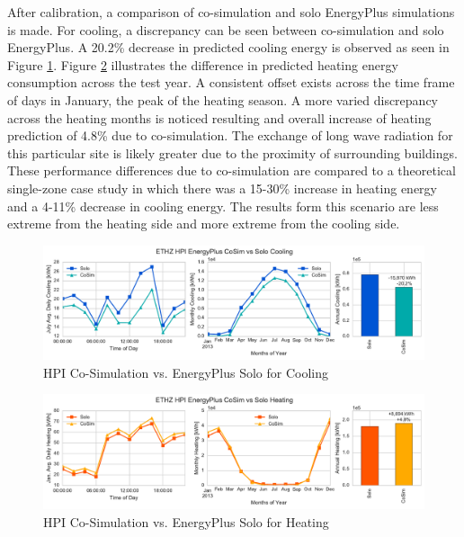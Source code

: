 \documentclass{tBPS2e}
\theoremstyle{plain}
\theoremstyle{definition}
\theoremstyle{remark}
\begin{document}
After calibration, a comparison of co-simulation and solo EnergyPlus simulations is made. For cooling, a discrepancy can be seen between co-simulation and solo EnergyPlus. A 20.2\% decrease in predicted cooling energy is observed as seen in Figure \ref{fig:hpi_energypluscooling}. Figure \ref{fig:hpi_energyplusheating} illustrates the difference in predicted heating energy consumption across the test year. A consistent offset exists across the time frame of days in January, the peak of the heating season. A more varied discrepancy across the heating months is noticed resulting and overall increase of heating prediction of 4.8\% due to co-simulation. The exchange of long wave radiation for this particular site is likely greater due to the proximity of surrounding buildings. These performance differences due to co-simulation are compared to a theoretical single-zone case study in which there was a 15-30\% increase in heating energy and a 4-11\% decrease in cooling energy. The results form this scenario are less extreme from the heating side and more extreme from the cooling side.

\begin{figure}[H]
\centering
\includegraphics[scale=0.55]{figures/HPI_EnergyPlus_Cooling}
\caption{HPI Co-Simulation vs. EnergyPlus Solo for Cooling}
\label{fig:hpi_energypluscooling}
\end{figure}


\begin{figure}[H]
\centering
\includegraphics[scale=0.55]{figures/HPI_EnergyPlus_Heating}
\caption{HPI Co-Simulation vs. EnergyPlus Solo for Heating}
\label{fig:hpi_energyplusheating}
\end{figure}
\end{document}
